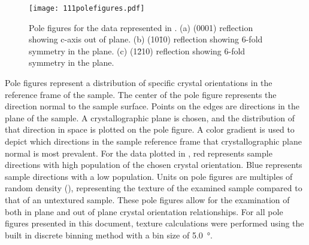 \begin{figure}
	\centerline{\texttt{[image: 111polefigures.pdf]}}
		\caption[Pole figures for the data represented in ]{%
			Pole figures for the data represented in . 
	(a) (0001) reflection showing c-axis out of plane. (b) (10\={1}0) 
	reflection showing 6-fold symmetry in the plane. (c) (1\={2}10) 
	reflection showing 6-fold symmetry in the plane.}
	\label{fig:111polefigures}
\end{figure}
Pole figures represent a distribution of specific crystal orientations in the reference
frame of the sample. The center of the pole figure represents the direction normal to the
sample surface. Points on the edges are directions in the plane of the sample. A
crystallographic plane is chosen, and the distribution of that direction in space is
plotted on the pole figure. A color gradient is used to depict which directions in the
sample reference frame that crystallographic plane normal is most prevalent. For the data
plotted in , red represents sample directions with high
population of the chosen crystal orientation. Blue represents sample directions with a low
population. Units on pole figures are multiples of random density (), 
representing the texture of the examined sample compared to that of an untextured sample. 
These pole figures allow for the examination of both in plane and out of plane
crystal orientation relationships. For all pole figures presented in this document,
texture calculations were performed using the built in discrete binning method with a bin
size of \SI{5.0}{\degree}.

